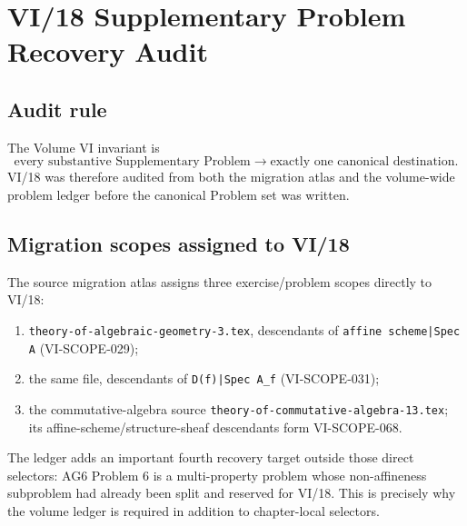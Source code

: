 \chapter*{VI/18 Supplementary Problem Recovery Audit}

\section*{Audit rule}
The Volume VI invariant is
\[
\boxed{\text{every substantive Supplementary Problem}\longrightarrow\text{exactly one canonical destination}.}
\]
VI/18 was therefore audited from both the migration atlas and the volume-wide problem ledger
before the canonical Problem set was written.

\section*{Migration scopes assigned to VI/18}
The source migration atlas assigns three exercise/problem scopes directly to VI/18:
\begin{enumerate}
\item \texttt{theory-of-algebraic-geometry-3.tex}, descendants of
\texttt{affine scheme|Spec A} (VI-SCOPE-029);
\item the same file, descendants of \texttt{D(f)|Spec A\_f} (VI-SCOPE-031);
\item the commutative-algebra source \texttt{theory-of-commutative-algebra-13.tex};
its affine-scheme/structure-sheaf descendants form VI-SCOPE-068.
\end{enumerate}
The ledger adds an important fourth recovery target outside those direct selectors:
AG6 Problem 6 is a multi-property problem whose non-affineness subproblem had already been
split and reserved for VI/18.  This is precisely why the volume ledger is required in
addition to chapter-local selectors.

